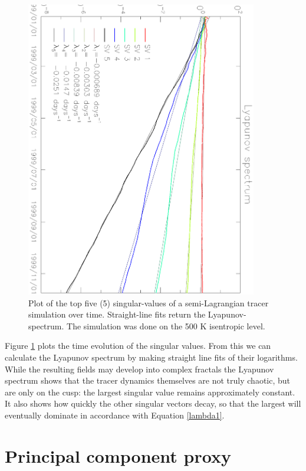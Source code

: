 \begin{figure}
\begin{center}
\includegraphics[angle=90,width=0.9\textwidth]{lyap_spec.eps}
\caption{Plot of the top five (5) singular-values of a semi-Lagrangian
tracer simulation over time.  Straight-line fits return the Lyapunov-spectrum.
The simulation was done on the 500 K isentropic level.}
\label{lyap_spec}
\end{center}
\end{figure}

Figure \ref{lyap_spec} plots the time evolution of the singular values.
From this we can calculate the Lyapunov spectrum by making straight line
fits of their logarithms.
While the resulting fields may develop into complex fractals \citep{Mills2009}
the Lyapunov spectrum shows that the tracer dynamics themselves 
are not truly chaotic, but are
only on the cusp: the largest singular value remains approximately constant.
It also shows how quickly the other singular vectors decay,
so that the largest will eventually dominate in accordance with
Equation \ref{lambda1}.

\section{Principal component proxy}
\label{pc_proxy}

